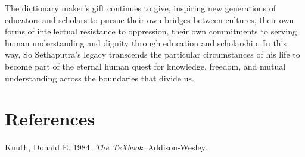 \documentclass[
  Letterpaper,
]{scrbook}
\newlength{\cslhangindent}
\newenvironment{CSLReferences}[2] %
 {\begin{list}{}{%
  \setlength{\itemindent}{0pt}
  \setlength{\leftmargin}{0pt}
  \setlength{\parsep}{0pt}
  \ifodd #1
   \setlength{\leftmargin}{\cslhangindent}
   \setlength{\itemindent}{-1\cslhangindent}
  \fi
  \setlength{\itemsep}{#2\baselineskip}}}
 {\end{list}}
\begin{document}
The dictionary maker's gift continues to give, inspiring new generations
of educators and scholars to pursue their own bridges between cultures,
their own forms of intellectual resistance to oppression, their own
commitments to serving human understanding and dignity through education
and scholarship. In this way, So Sethaputra's legacy transcends the
particular circumstances of his life to become part of the eternal human
quest for knowledge, freedom, and mutual understanding across the
boundaries that divide us.


\chapter*{References}\label{references}


\label{refs}
\begin{CSLReferences}{1}{0}
Knuth, Donald E. 1984. \emph{The TeXbook}. Addison-Wesley.

\end{CSLReferences}


\backmatter
\end{document}

